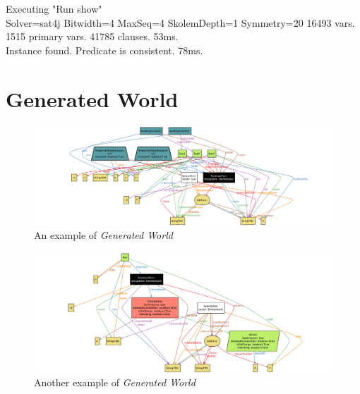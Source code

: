    \vspace{1cm}

   Executing "Run show" \\ \noindent
      Solver=sat4j Bitwidth=4 MaxSeq=4 SkolemDepth=1 Symmetry=20
      16493 vars. 1515 primary vars. 41785 clauses. 53ms. \\ \noindent
      Instance found. Predicate is consistent. 78ms.


\clearpage

\section{Generated World}

   \begin{figure}[H]
   \begin{center}
     \includegraphics[width=\textwidth]{./img/alloy/alloy2.png}
     \hspace{0.05\linewidth}
     \centering
     \caption{An example of \textit{Generated World}}
     \label{img:generatedWorld}
   \end{center}
   \end{figure}

 \begin{figure}[H]
 \begin{center}
   \includegraphics[width=\textwidth]{./img/alloy/alloy3.png}
   \hspace{0.05\linewidth}
   \centering
   \caption{Another example of \textit{Generated World}}
   \label{img:generatedWorld2}
 \end{center}
 \end{figure}

